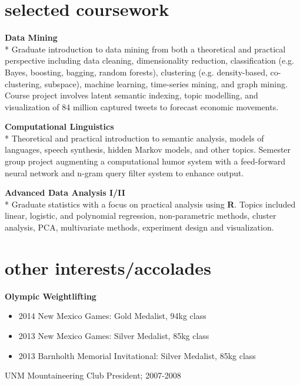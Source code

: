 \documentclass[]{friggeri-cv} %
\begin{document}



\section{selected coursework}
\begin{description}
  \item \textbf{Data Mining } \\*
    Graduate introduction to data mining from both a theoretical and practical
    perspective including data cleaning, dimensionality reduction,
    classification (e.g. Bayes, boosting, bagging, random forests), clustering
    (e.g. density-based, co-clustering, subspace), machine learning,
    time-series mining, and graph mining. Course project involves latent
    semantic indexing, topic modelling, and visualization
    of 84 million captured tweets to forecast economic movements. \hfill
   \item \textbf{Computational Linguistics} \\*
     Theoretical and practical introduction to semantic analysis, models of
     languages, speech synthesis, hidden Markov models, and other topics.
     Semester group project augmenting a computational humor system with a
     feed-forward neural network and n-gram query filter system to enhance
     output.
 \item \textbf{Advanced Data Analysis I/II} \\*
     Graduate statistics with a focus on practical analysis using \textbf{R}.
     Topics included linear, logistic, and polynomial regression,
     non-parametric methods, cluster analysis, PCA, multivariate methods,
     experiment design and visualization.
\end{description}


\section{other interests/accolades}
\textbf{Olympic Weightlifting}
\begin{itemize}
\item 2014 New Mexico Games: Gold Medalist, 94kg class
\item 2013 New Mexico Games: Silver Medalist, 85kg class
\item 2013 Barnholth Memorial Invitational: Silver Medalist, 85kg class
\end{itemize}
UNM Mountaineering Club President; 2007-2008
\end{document}
